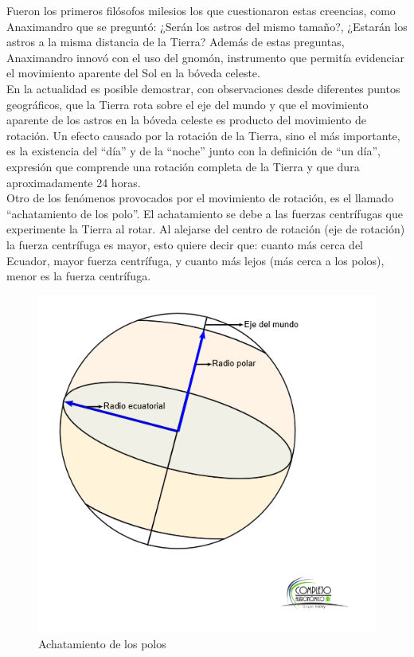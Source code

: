 \documentclass[10pt,a4paper]{article}
\begin{document}
Fueron los primeros filósofos milesios los que cuestionaron estas creencias, como Anaximandro que se preguntó:  ¿Serán los astros del mismo tamaño?, ¿Estarán los astros a la misma distancia de la Tierra? Además de estas preguntas, Anaximandro innovó con el uso del gnomón, instrumento que permitía evidenciar el movimiento aparente del Sol en la bóveda celeste. \\

En la actualidad es posible demostrar, con observaciones desde diferentes puntos geográficos, que la Tierra rota sobre el eje del mundo y que el movimiento aparente de los astros en la bóveda celeste es producto del movimiento de rotación. Un efecto causado por la rotación de la Tierra, sino el más importante, es la existencia del ``día'' y de la ``noche'' junto con la definición de ``un día'', expresión que comprende una rotación completa de la Tierra y que dura aproximadamente 24 horas. \\

Otro de los fenómenos provocados por el movimiento de rotación, es el llamado ``achatamiento de los polo''. El achatamiento se debe a las fuerzas centrífugas que experimente la Tierra al rotar. Al alejarse del centro de rotación (eje de rotación) la fuerza centrífuga es mayor, esto quiere decir que: cuanto más cerca del Ecuador, mayor fuerza centrífuga, y cuanto más lejos (más cerca a los polos), menor es la fuerza centrífuga.

\begin{figure}[H]
\centering
\includegraphics[scale=0.65]{Imagenes/Achatamiento_01} 
\caption{Achatamiento de los polos}
\label{achatamiento}
\end{figure}
\end{document}
